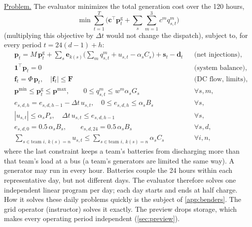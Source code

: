 \documentclass[10pt]{article}
\newcommand{\alert}[1]{{\color{alertblue}\uline{#1}}}
\begin{document}
\alert{Problem.} The evaluator minimizes the total generation cost over the
120 hours,
\[
  \min \sum_{t=1}^{T}\Big( \mathbf c^{\top} \mathbf p^{\mathrm g}_t + \sum_s \sum_{m=1}^{3} c^m q^m_{s,t} \Big)
\]
(multiplying this objective by $\Delta t$ would not change the dispatch),
subject to, for every period $t=24(d-1)+h$:
\begin{align*}
  & \mathbf p_t = M\,\mathbf p^{\mathrm g}_t
    + \sum_s \mathbf e_{k(s)} \Big(\sum_m q^m_{s,t} + u_{s,t} - \alpha_s C_s\Big)
    + \mathbf s_t - \mathbf d_t && \text{(net injections)},\\
  & \mathbf 1^{\top} \mathbf p_t = 0 && \text{(system balance)},\\
  & \mathbf f_t = \Phi\,\mathbf p_t,\quad |\mathbf f_t| \le \mathbf F && \text{(DC flow, limits)},\\
  & \mathbf p^{\min} \le \mathbf p^{\mathrm g}_t \le \mathbf p^{\max},\qquad 0 \le q^m_{s,t} \le w^m \alpha_s G_s && \forall s, m,\\
  & e_{s,d,h} = e_{s,d,h-1} - \Delta t\, u_{s,t},\quad 0 \le e_{s,d,h} \le \alpha_s B_s && \forall s,\\
  & |u_{s,t}| \le \alpha_s P_s,\quad \Delta t\, u_{s,t} \le e_{s,d,h-1} && \forall s,\\
  & e_{s,d,0} = 0.5\, \alpha_s B_s, \qquad e_{s,d,24} = 0.5\, \alpha_s B_s && \forall s,d,\\
  & \sum_{s \in \text{team } i,\ k(s)=n} u_{s,t} \le \sum_{s \in \text{team } i,\ k(s)=n} \alpha_s C_s && \forall i, n,
\end{align*}
where the last constraint keeps a
team's batteries from discharging more than that team's load at a bus (a
team's generators are limited the same way). A generator may run in every
hour. Batteries couple the 24 hours within each representative day, but
not different days. The evaluator therefore solves one independent linear
program per day; each day starts and ends at half charge. How it solves these
daily problems quickly is the subject of \cref{app:benders}. The grid operator (instructor) solves it exactly. The
preview drops storage, which makes every operating period independent (\cref{sec:preview}).
\end{document}
